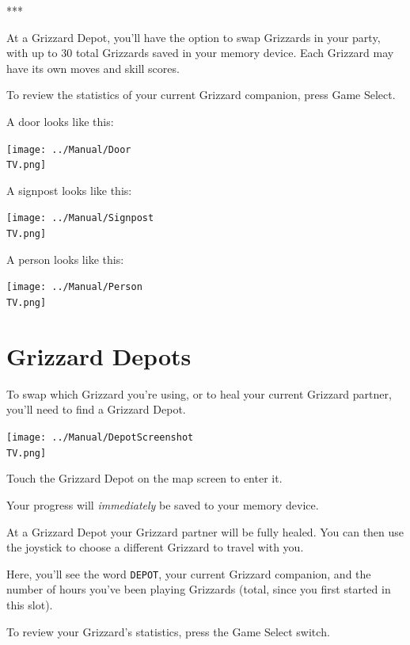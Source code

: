 \documentclass[10pt,twocolumn,openany,article]{memoir}
\newcommand\TV{NTSC}
\newcommand\TV{PAL}
\newcommand\TV{SECAM}
\begin{document}
***

At a  Grizzard Depot, you'll have  the option to swap  Grizzards in your
party,  with up  to  30 total  Grizzards saved  in  your memory  device.
Each Grizzard may have its own moves and skill scores.

\fi

To  review the  statistics  of your  current  Grizzard companion,  press
Game Select.

A door looks like this:

\begin{center}
  \texttt{[image: ../Manual/Door\\TV.png]}
\end{center}

A signpost looks like this:

\begin{center}
  \texttt{[image: ../Manual/Signpost\\TV.png]}
\end{center}

A person looks like this:

\begin{center}
  \texttt{[image: ../Manual/Person\\TV.png]}
\end{center}

\section{Grizzard Depots}

To \ifdefined\DEMO\else  swap which  Grizzard you're using,  or to  \fi heal
your current Grizzard partner, you'll need to find a Grizzard Depot.

\texttt{[image: ../Manual/DepotScreenshot\\TV.png]}

Touch the Grizzard Depot on the map screen to enter it.

Your progress will \emph{immediately} be saved to your memory device.

At  a  Grizzard  Depot  your  Grizzard partner  will  be  fully  healed.
\ifdefined\DEMO\else You  can then  use the joystick  to choose  a different
Grizzard to travel with you. \fi

Here,  you'll  see  the   word  \texttt{DEPOT},  your  current  Grizzard
companion,  and  the  number  of hours  you've  been  playing  Grizzards
(total, since you first started in this slot).

To review your Grizzard's statistics, press the Game Select switch.
\end{document}
